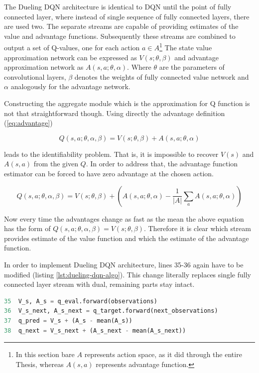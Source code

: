 The Dueling DQN architecture is identical to DQN until the point of fully connected layer, where instead of single sequence of fully
connected layers, there are used two. The separate streams are capable of providing estimates of the value and advantage functions.
Subsequently these streams are combined to output a set of Q-values, one for each action $a \in A$\footnote{In this section bare $A$
represents action space, as it did through the entire Thesis, whereas $A(s, a)$ represents advantage function.}
The state value approximation network can be expressed as $V(s; \theta, \beta)$ and advantage approximation network as $A(s, a; \theta,
\alpha)$. Where $\theta$ are the parameters of convolutional layers, $\beta$ denotes the weights of fully connected value network and
$\alpha$ analogously for the advantage network.

Constructing the aggregate module which is the approximation for Q function is not that straightforward though. Using directly the advantage definition (\ref{eq:advantage})

\begin{equation}
    Q(s, a; \theta, \alpha, \beta) = V(s; \theta, \beta) + A(s, a; \theta, \alpha)
\end{equation}

leads to the identifiability problem. That is, it is impossible to recover $V(s)$ and $A(s, a)$ from the given $Q$. In order to address
that, the advantage function estimator can be forced to have zero advantage at the chosen action.

\begin{equation}
    Q(s, a; \theta, \alpha, \beta) = V(s; \theta, \beta) + \left(A(s, a; \theta, \alpha) - \frac{1}{|A|} \sum_a A(s, a; \theta, \alpha)\right)
\end{equation}

Now every time the advantages change as fast as the mean the above equation has the form of $Q(s, a; \theta, \alpha, \beta) = V(s; \theta,
\beta)$. Therefore it is clear which stream provides estimate of the value function and which the estimate of the advantage function.

In order to implement Dueling DQN architecture, lines 35-36 again have to be modified (listing \ref{lst:dueling-dqn-algo}). This change literally replaces single fully connected layer stream with dual, remaining parts stay intact.

\newpage

\begin{lstlisting}[language=Python, caption={Dueling Deep Q-learning modification.}, label={lst:dueling-dqn-algo}]
35  V_s, A_s = q_eval.forward(observations)
36  V_s_next, A_s_next = q_target.forward(next_observations)
37  q_pred = V_s + (A_s - mean(A_s))
38  q_next = V_s_next + (A_s_next - mean(A_s_next))
\end{lstlisting}

